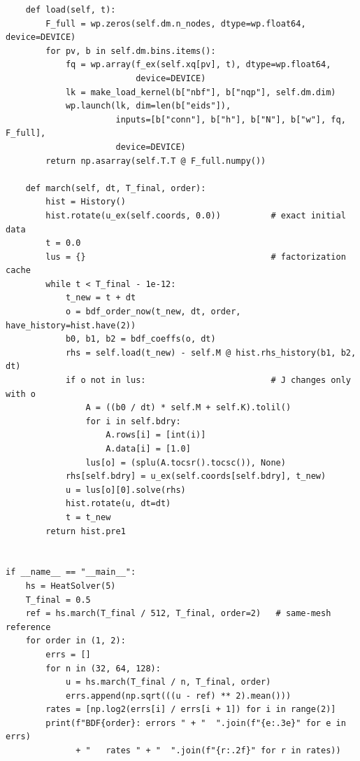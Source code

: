 \begin{lstlisting}
    def load(self, t):
        F_full = wp.zeros(self.dm.n_nodes, dtype=wp.float64, device=DEVICE)
        for pv, b in self.dm.bins.items():
            fq = wp.array(f_ex(self.xq[pv], t), dtype=wp.float64,
                          device=DEVICE)
            lk = make_load_kernel(b["nbf"], b["nqp"], self.dm.dim)
            wp.launch(lk, dim=len(b["eids"]),
                      inputs=[b["conn"], b["h"], b["N"], b["w"], fq, F_full],
                      device=DEVICE)
        return np.asarray(self.T.T @ F_full.numpy())

    def march(self, dt, T_final, order):
        hist = History()
        hist.rotate(u_ex(self.coords, 0.0))          # exact initial data
        t = 0.0
        lus = {}                                     # factorization cache
        while t < T_final - 1e-12:
            t_new = t + dt
            o = bdf_order_now(t_new, dt, order, have_history=hist.have(2))
            b0, b1, b2 = bdf_coeffs(o, dt)
            rhs = self.load(t_new) - self.M @ hist.rhs_history(b1, b2, dt)
            if o not in lus:                         # J changes only with o
                A = ((b0 / dt) * self.M + self.K).tolil()
                for i in self.bdry:
                    A.rows[i] = [int(i)]
                    A.data[i] = [1.0]
                lus[o] = (splu(A.tocsr().tocsc()), None)
            rhs[self.bdry] = u_ex(self.coords[self.bdry], t_new)
            u = lus[o][0].solve(rhs)
            hist.rotate(u, dt=dt)
            t = t_new
        return hist.pre1


if __name__ == "__main__":
    hs = HeatSolver(5)
    T_final = 0.5
    ref = hs.march(T_final / 512, T_final, order=2)   # same-mesh reference
    for order in (1, 2):
        errs = []
        for n in (32, 64, 128):
            u = hs.march(T_final / n, T_final, order)
            errs.append(np.sqrt(((u - ref) ** 2).mean()))
        rates = [np.log2(errs[i] / errs[i + 1]) for i in range(2)]
        print(f"BDF{order}: errors " + "  ".join(f"{e:.3e}" for e in errs)
              + "   rates " + "  ".join(f"{r:.2f}" for r in rates))
\end{lstlisting}

